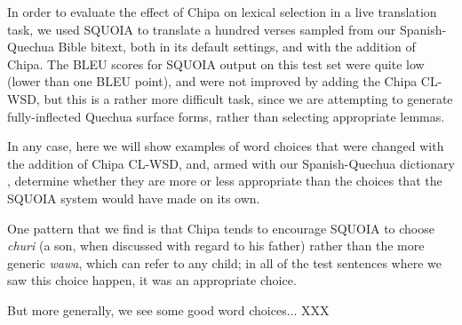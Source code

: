 In order to evaluate the effect of Chipa on lexical selection in a live
translation task, we used SQUOIA to translate a hundred verses sampled from our
Spanish-Quechua Bible bitext, both in its default settings, and with the
addition of Chipa. The BLEU scores for SQUOIA output on this test set were
quite low (lower than one BLEU point), and were not improved by adding the
Chipa CL-WSD, but this is a rather more difficult task, since we are attempting
to generate fully-inflected Quechua surface forms, rather than selecting
appropriate lemmas.

In any case, here we will show examples of word choices that were changed with
the addition of Chipa CL-WSD, and, armed with our Spanish-Quechua dictionary
\cite{academiamayor}, determine whether they are more or less appropriate than
the choices that the SQUOIA system would have made on its own.

One pattern that we find is that Chipa tends to encourage SQUOIA to choose
\emph{churi} (a son, when discussed with regard to his father) rather than the
more generic \emph{wawa}, which can refer to any child; in all of the test
sentences where we saw this choice happen, it was an appropriate choice.

But more generally, we see some good word choices... XXX

\label{sent:estacion}

